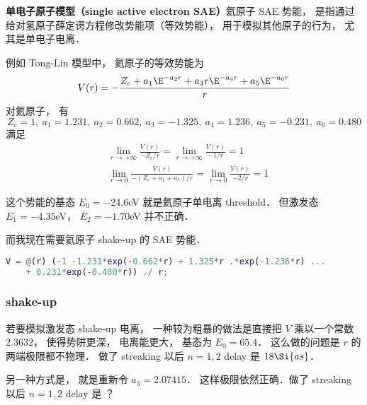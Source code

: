 
\begin{issues}
\issueDraft
\end{issues}

\textbf{单电子原子模型（single active electron SAE）}氦原子 SAE 势能， 是指通过给对氢原子薛定谔方程修改势能项（等效势能）， 用于模拟其他原子的行为， 尤其是单电子电离．

例如 Tong-Lin 模型中， 氦原子的等效势能为
\begin{equation}
V(r) = -\frac{Z_c + a_1 \E^{-a_2 r} + a_3 r \E^{-a_4 r} + a_5 \E^{-a_6 r}}{r}
\end{equation}
对氦原子， 有
\begin{equation}
Z_c = 1, \ a_1 = 1.231,\ a_2 = 0.662,\ a_3 = -1.325,\ a_4 = 1.236,\ a_5 = -0.231,\ a_6 = 0.480
\end{equation}
满足
\begin{align}
&\lim_{r\to +\infty} \frac{V(r)}{-Z_c/r} = \lim_{r\to +\infty} \frac{V(r)}{-1/r} = 1\\
&\lim_{r\to 0} \frac{V(r)}{-(Z_c + a_1 + a_5)/r} = \lim_{r\to 0} \frac{V(r)}{-2/r} = 1
\end{align}

这个势能的基态 $E_0 = -24.6$eV 就是氦原子单电离 threshold． 但激发态 $E_1 = -4.35$eV， $E_2 = -1.70$eV 并不正确．

而我现在需要氦原子 shake-up 的 SAE 势能．

\begin{lstlisting}[language=matlab]
V = @(r) (-1 -1.231*exp(-0.662*r) + 1.325*r .*exp(-1.236*r) ...
    + 0.231*exp(-0.480*r)) ./ r;
\end{lstlisting}

\subsubsection{shake-up}
若要模拟激发态 shake-up 电离， 一种较为粗暴的做法是直接把 $V$ 乘以一个常数 $2.3632$， 使得势阱更深， 电离能更大， 基态为 $E_0 = 65.4$． 这么做的问题是 $r$ 的两端极限都不物理． 做了 streaking 以后 $n=1,2$ delay 是 $18\Si{as}$．

另一种方式是， 就是重新令 $a_3 = 2.07415$． 这样极限依然正确．做了 streaking 以后 $n=1,2$ delay 是 ？
